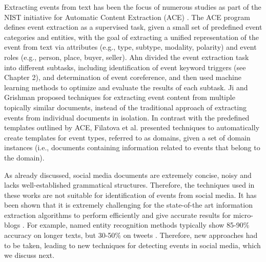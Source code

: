 Extracting events from text has been the focus of numerous studies as part of the NIST initiative for Automatic Content Extraction (ACE) \cite{ahn2006stages,ji2008refining}. The ACE program defines event extraction as a supervised task, given a small set of predefined event categories and entities, with the goal of extracting a unified representation of the event from text
via attributes (e.g., type, subtype, modality, polarity) and event roles (e.g., person, place, buyer, seller). Ahn \cite{ahn2006stages} divided the event extraction task into different subtasks, including identification of event keyword triggers (see Chapter 2), and determination of event
coreference, and then used machine learning methods to optimize and evaluate the results of each subtask. Ji and Grishman \cite{ji2008refining} proposed techniques for extracting event content from multiple topically similar documents, instead of the traditional approach of extracting events from individual documents in isolation. In contrast with the predefined templates outlined by ACE, Filatova et al. \cite{filatova2006automatic} presented techniques to automatically create templates for event types, referred to as domains, given a set of domain instances (i.e., documents containing information related to events that belong to the domain). 

As already discussed, social media documents are extremely concise, noisy and lacks well-established grammatical structures. Therefore, the techniques used in these works are not suitable for identification of events from social media.  It has been shown that it is extremely challenging for the state-of-the art information extraction algorithms to perform efficiently and give accurate results for micro-blogs \cite{derczynski2013microblog}. For example, named entity recognition methods typically show 85-90\% accuracy on longer texts, but 30-50\% on tweets \cite{ritter2011named}. Therefore, new approaches had to be taken, leading to new techniques for detecting events in social media, which we discuss next.


